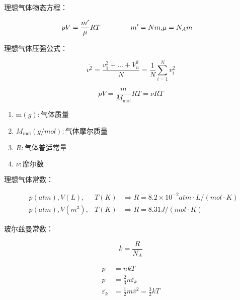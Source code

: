 理想气体物态方程：

\begin{equation}
    \begin{aligned}
        pV=\frac{m'}{\mu}RT\hspace{10ex}m'=Nm , & \mu=N_Am
    \end{aligned}
\end{equation}

理想气体压强公式：

\begin{equation}
    \overline{v^2}=\frac{v_1^2+\ldots+V_n^2}{N}=\frac{1}{N}\sum_{i=1}^{N}{v_i^2}
\end{equation}

\begin{equation}
    pV=\frac{m}{M_\mathrm{mol}}RT=\nu{}RT
\end{equation}

\begin{enumerate}
    \item $\mathrm{m}(g):\text{气体质量}$
    \item $M_\mathrm{mol}(g/mol):\text{气体摩尔质量}$
    \item $R:\text{气体普适常量}$
    \item $\nu:\text{摩尔数}$
\end{enumerate}

理想气体常数：

\begin{equation}
    \begin{aligned}
         & p(atm),  V(L),   & T(K) & \Rightarrow R=8.2\times 10^{-2}atm\cdot L/(mol\cdot K) \\
         & p(atm),  V(m^3), & T(K) & \Rightarrow R=8.31 J/(mol\cdot K)
    \end{aligned}
\end{equation}


玻尔兹曼常数：

\begin{equation}
    k=\frac{R}{N_A}
\end{equation}

\begin{equation}
    \begin{aligned}
        p                        & =nkT                                      \\
        p                        & =\frac{2}{3}n \overline{\varepsilon_k}    \\
        \overline{\varepsilon_k} & =\frac{1}{2}m\overline{v}^2=\frac{3}{2}kT
    \end{aligned}
\end{equation}

